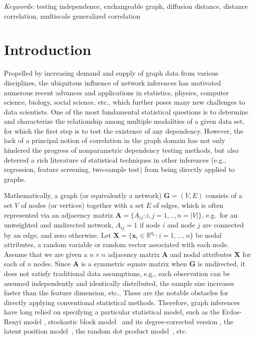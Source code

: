 \documentclass[11pt]{article}
\theoremstyle{definition}
\begin{document}
\noindent%
{\it Keywords:} testing independence, exchangeable graph, diffusion distance, distance correlation, multiscale generalized correlation

\sloppy
\doublespacing

\section{Introduction}
\label{sec:intro}
	\vspace*{-0.2cm}
Propelled by increasing demand and supply of graph data from various disciplines, the ubiquitous influence of network inferences has motivated numerous recent advances and applications in statistics, physics, computer science, biology, social science, etc., which further poses many new challenges to data scientists. One of the most fundamental statistical questions is to determine and characterize the relationship among multiple modalities of a given data set, for which the first step is to test the existence of any dependency. However, the lack of a principal notion of correlation in the graph domain has not only hindered the progress of nonparametric dependency testing methods, but also deterred a rich literature of statistical techniques in other inferences (e.g., regression, feature screening, two-sample test) from being directly applied to graphs.
 
Mathematically, a graph (or equivalently a network) $\mathbf{G}=(V,E)$ consists of a set $V$ of nodes (or vertices) together with a set $E$ of edges, which is often represented via an adjacency matrix $\mathbf{A} = \{A_{ij} : i,j= 1,..,n = |V| \}$, e.g.~for an unweighted and undirected network, $A_{ij} = 1$ if node $i$ and node $j$ are connected by an edge, and zero otherwise. Let $\mathbf{X} = \{  \mathbf{x}_{i} \in \mathbb{R}^{q_{x}} : i = 1, \ldots, n \}$ be nodal attributes, a random variable or random vector associated with each node. Assume that we are given a $n \times n$ adjacency matrix $\mathbf{A}$ and nodal attributes $\mathbf{X}$ for each of $n$ nodes. Since $\mathbf{A}$ is a symmetric square matrix when $\mathbf{G}$ is undirected, it does not satisfy traditional data assumptions, e.g., each observation can be assumed independently and identically distributed, the sample size increases faster than the feature dimension, etc.. These are the notable obstacles for directly applying conventional statistical methods. Therefore, graph inferences have long relied on specifying a particular statistical model, such as the Erdos-Renyi model \cite{erdosrenyi1959,Gilbert1959}, stochastic block model~\cite{HollandEtAl1983, rohe2011spectral,SussmanEtAl2012,Lei2015} and its degree-corrected version \cite{karrer2011stochastic, ZhaoLevinaZhu2012}, the latent position model~\cite{TangSussmanPriebe2013,fosdick2015testing}, the random dot product model~\cite{YoungScheinerman2007, sussman2014consistent}, etc. 
\end{document}
